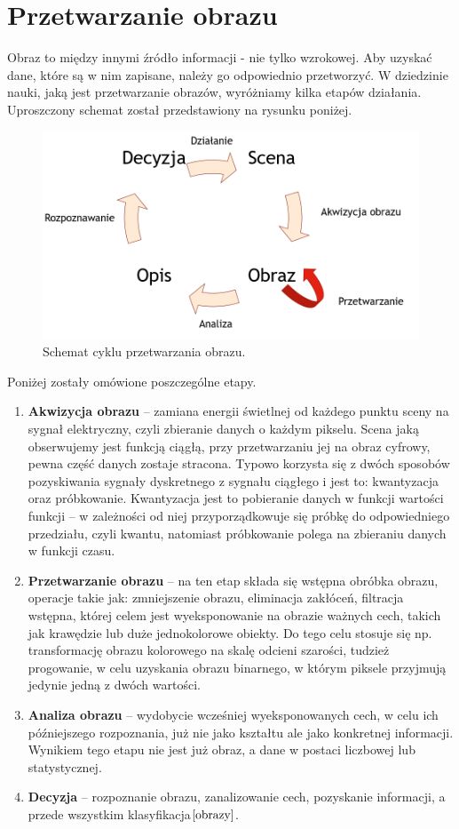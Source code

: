 \documentclass[eng,oneside]{mgr}
\begin{document}
\chapter{Przetwarzanie obrazu}
Obraz to między innymi źródło informacji - nie tylko wzrokowej. Aby uzyskać dane, które są w nim zapisane, należy go odpowiednio przetworzyć. W dziedzinie nauki, jaką jest przetwarzanie obrazów, wyróżniamy kilka etapów działania. Uproszczony schemat został przedstawiony na rysunku poniżej.
\begin{figure}[htbp]
\centering
\includegraphics[scale=0.5]{cyklprzetwarzania.png}
\caption{Schemat cyklu przetwarzania obrazu.}\par\medskip
\end{figure}
\par Poniżej zostały omówione poszczególne etapy.
\begin{enumerate}
\item 	\textbf{Akwizycja obrazu} – zamiana energii świetlnej od każdego punktu sceny na sygnał elektryczny, czyli zbieranie danych o każdym pikselu. Scena jaką obserwujemy jest funkcją ciągłą, przy przetwarzaniu jej na obraz cyfrowy, pewna część danych zostaje stracona. Typowo korzysta się z dwóch sposobów pozyskiwania sygnały dyskretnego z sygnału ciągłego i jest to: kwantyzacja oraz próbkowanie. Kwantyzacja jest to pobieranie danych w funkcji wartości funkcji – w zależności od niej przyporządkowuje się próbkę do odpowiedniego przedziału, czyli kwantu, natomiast próbkowanie polega na zbieraniu danych w funkcji czasu.
\item 	\textbf{Przetwarzanie obrazu} – na ten etap składa się wstępna obróbka obrazu, operacje takie jak: zmniejszenie obrazu, eliminacja zakłóceń, filtracja wstępna, której celem jest wyeksponowanie na obrazie ważnych cech, takich jak krawędzie lub duże jednokolorowe obiekty. Do tego celu stosuje się np. transformację obrazu kolorowego na skalę odcieni szarości, tudzież progowanie, w celu uzyskania obrazu binarnego, w którym piksele przyjmują jedynie jedną z dwóch wartości.
\item 	\textbf{Analiza obrazu} – wydobycie wcześniej wyeksponowanych cech, w celu ich późniejszego rozpoznania, już nie jako kształtu ale jako konkretnej informacji. Wynikiem tego etapu nie jest już obraz, a dane w postaci liczbowej lub statystycznej.
\item 	\textbf{Decyzja} – rozpoznanie obrazu, zanalizowanie cech, pozyskanie informacji, a przede wszystkim klasyfikacja$\cite{obrazy}$.
\end{enumerate}
\end{document}
